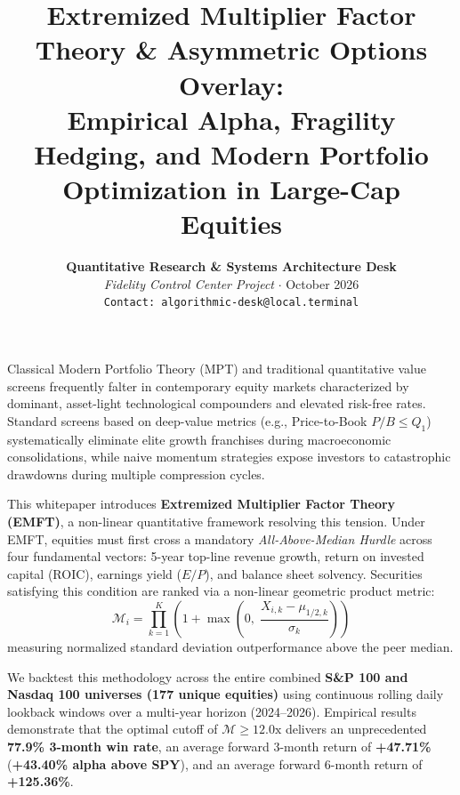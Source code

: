 \documentclass[11pt]{article}
\title{\vspace{-1.0cm}
    \textbf{\LARGE Extremized Multiplier Factor Theory \& Asymmetric Options Overlay:}\\[0.35cm]
    \Large Empirical Alpha, Fragility Hedging, and Modern Portfolio Optimization in Large-Cap Equities
}
\author{
    \textbf{Quantitative Research \& Systems Architecture Desk}\\
    \textit{Fidelity Control Center Project} $\cdot$ October 2026\\
    \texttt{Contact: algorithmic-desk@local.terminal}
}
\date{}
\begin{document}
\maketitle

\begin{tcolorbox}[colback=lightgraybg,colframe=brandblue,title=\textbf{Executive Summary \& Abstract},fonttitle=\bfseries\color{white},arc=2mm]
\small
Classical Modern Portfolio Theory (MPT) and traditional quantitative value screens frequently falter in contemporary equity markets characterized by dominant, asset-light technological compounders and elevated risk-free rates. Standard screens based on deep-value metrics (e.g., Price-to-Book $P/B \le Q_1$) systematically eliminate elite growth franchises during macroeconomic consolidations, while naive momentum strategies expose investors to catastrophic drawdowns during multiple compression cycles. 

This whitepaper introduces \textbf{Extremized Multiplier Factor Theory (EMFT)}, a non-linear quantitative framework resolving this tension. Under EMFT, equities must first cross a mandatory \textit{All-Above-Median Hurdle} across four fundamental vectors: 5-year top-line revenue growth, return on invested capital (ROIC), earnings yield ($E/P$), and balance sheet solvency. Securities satisfying this condition are ranked via a non-linear geometric product metric:
\begin{equation*}
    \mathcal{M}_i = \prod_{k=1}^K \left(1 + \max\left(0, \; \frac{X_{i,k} - \mu_{1/2,k}}{\sigma_k}\right)\right)
\end{equation*}
measuring normalized standard deviation outperformance above the peer median.

We backtest this methodology across the entire combined \textbf{S\&P 100 and Nasdaq 100 universes (177 unique equities)} using continuous rolling daily lookback windows over a multi-year horizon (2024--2026). Empirical results demonstrate that the optimal cutoff of $\mathcal{M} \ge 12.0\text{x}$ delivers an unprecedented \textbf{77.9\% 3-month win rate}, an average forward 3-month return of \textbf{+47.71\%} (\textbf{+43.40\% alpha above SPY}), and an average forward 6-month return of \textbf{+125.36\%}. 


\end{tcolorbox}
\end{document}
